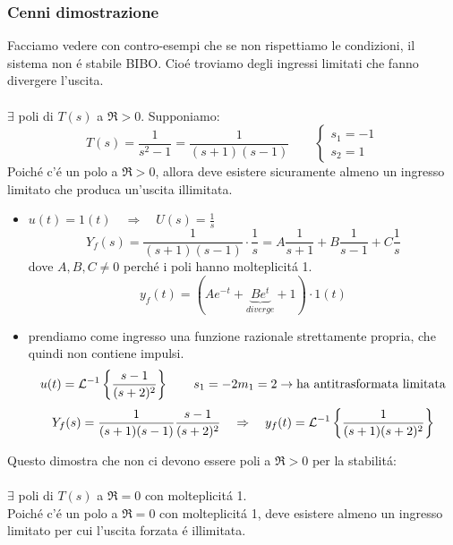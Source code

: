 \documentclass[../main.tex]{subfiles}
\begin{document}
	\subsubsection{Cenni dimostrazione}
	Facciamo vedere con contro-esempi che se non rispettiamo le condizioni, il sistema non \'{e} stabile BIBO. Cio\'{e} troviamo degli ingressi limitati che fanno divergere l'uscita.\\
	\smallskip\\
	$ \exists $ poli di $ T(s) $ a $ \Re > 0 $. Supponiamo: 
	\[ T(s) = \frac{1}{s^2-1} = \frac{1}{(s+1)(s-1)} \qquad \begin{cases} s_1 = -1\\ s_2 = 1 \end{cases} \]
	Poich\'{e} c'\'{e} un polo a $ \Re > 0 $, allora deve esistere sicuramente almeno un ingresso limitato che produca un'uscita illimitata.
	\begin{itemize}
		\item $ u(t) = 1(t) \quad \Rightarrow \quad U(s) = \frac{1}{s} $\\
		\[ Y_f(s) = \frac{1}{(s+1)(s-1)} \cdot \frac{1}{s} = A\frac{1}{s+1}  + B\frac{1}{s-1} + C\frac{1}{s}\]
		dove $ A, B, C \neq 0 $ perch\'{e} i poli hanno molteplicit\'{a} 1.
		\[ y_f(t) = (Ae^{-t} + \underbrace{Be^t}_{diverge} + 1) \cdot 1(t) \]
		\item prendiamo come ingresso una funzione razionale strettamente propria, che quindi non contiene impulsi.
		\[ u(t) = \mathcal{L}^{-1} \left\lbrace \frac{s-1}{(s+2)^2} \right\rbrace \qquad s_1=-2 m_1=2 \rightarrow \text{ha antitrasformata limitata}\]
		\[ Y_f(s) = \frac{1}{(s+1)(s-1)} \frac{s-1}{(s+2)^2} \quad \Rightarrow \quad y_f(t) = \mathcal{L}^{-1} \left\lbrace \frac{1}{(s+1)(s+2)^2} \right\rbrace\]		
	\end{itemize}
	Questo dimostra che non ci devono essere poli a $ \Re > 0 $ per la stabilit\'{a}:\\
	\smallskip\\
	$ \exists $ poli di $ T(s) $ a $ \Re = 0 $ con molteplicit\'{a} 1.\\
	Poich\'{e} c'\'{e} un polo a $ \Re = 0 $ con molteplicit\'{a} 1, deve esistere almeno un ingresso limitato per cui l'uscita forzata \'{e} illimitata.\\
\end{document}
